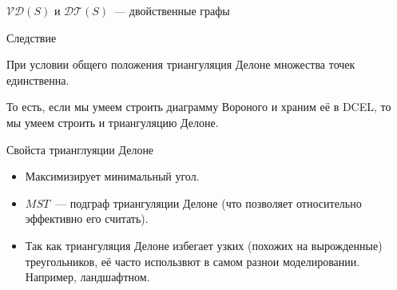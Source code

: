 \documentclass[12pt,aspectratio=169,svgnames]{beamer}
\begin{document}
    \begin{frame}{$\mathcal{V}\mathcal{D}(S)$ и $\mathcal{D}\mathcal{T}(S)$~--- двойственные графы}

        \begin{block}{Следствие}

                При условии общего положения триангуляция Делоне множества точек единственна.

        \end{block}

        То есть, если мы умеем строить диаграмму Вороного и храним её в DCEL, то мы умеем строить и триангуляцию
        Делоне.

    \end{frame}

    \begin{frame}{Свойста трианглуяции Делоне}

        \begin{itemize}

            \item Максимизирует минимальный угол.

            \item $MST$~--- подграф триангуляции Делоне (что позволяет относительно эффективно его считать).

            \item Так как триангуляция Делоне избегает узких (похожих на вырожденные) треугольников, её часто использвют
                  в самом разнои моделировании. Например, ландшафтном.

        \end{itemize}

    \end{frame}
\end{document}
